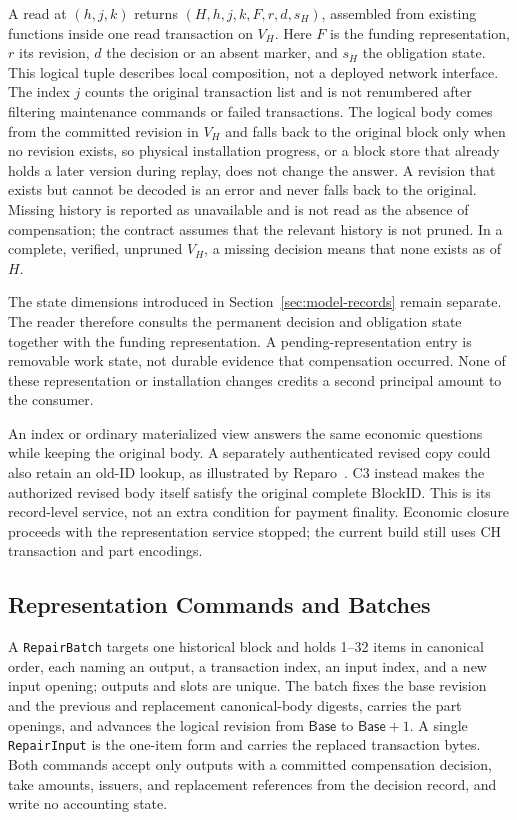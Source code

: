A read at $(h,j,k)$ returns $(H,h,j,k,F,r,d,s_H)$, assembled from existing functions inside one read transaction on $V_H$. Here $F$ is the funding representation, $r$ its revision, $d$ the decision or an absent marker, and $s_H$ the obligation state. This logical tuple describes local composition, not a deployed network interface. The index $j$ counts the original transaction list and is not renumbered after filtering maintenance commands or failed transactions. The logical body comes from the committed revision in $V_H$ and falls back to the original block only when no revision exists, so physical installation progress, or a block store that already holds a later version during replay, does not change the answer. A revision that exists but cannot be decoded is an error and never falls back to the original. Missing history is reported as unavailable and is not read as the absence of compensation; the contract assumes that the relevant history is not pruned. In a complete, verified, unpruned $V_H$, a missing decision means that none exists as of $H$.



The state dimensions introduced in Section~\ref{sec:model-records} remain separate.
The reader therefore consults the permanent decision and obligation
state together with the funding representation. A pending-representation
entry is removable work state, not durable evidence that compensation
occurred. None of these representation or installation changes credits
a second principal amount to the consumer.

An index or ordinary materialized view answers the same economic
questions while keeping the original body. A separately authenticated
revised copy could also retain an old-ID lookup, as illustrated by
Reparo~\cite{reparo}. C3 instead makes the authorized revised body
itself satisfy the original complete BlockID. This is its record-level
service, not an extra condition for payment finality.
Economic closure proceeds with the representation service stopped;
the current build still uses CH transaction and part encodings.

\subsection{Representation Commands and Batches}
\label{sec:protocol-batch}

A \texttt{RepairBatch} targets one historical block and holds 1--32 items in canonical order, each naming an output, a transaction index, an input index, and a new input opening; outputs and slots are unique. The batch fixes the base revision and the previous and replacement canonical-body digests, carries the part openings, and advances the logical revision from $\mathsf{Base}$ to $\mathsf{Base}+1$. A single \texttt{RepairInput} is the one-item form and carries the replaced transaction bytes. Both commands accept only outputs with a committed compensation decision, take amounts, issuers, and replacement references from the decision record, and write no accounting state.

